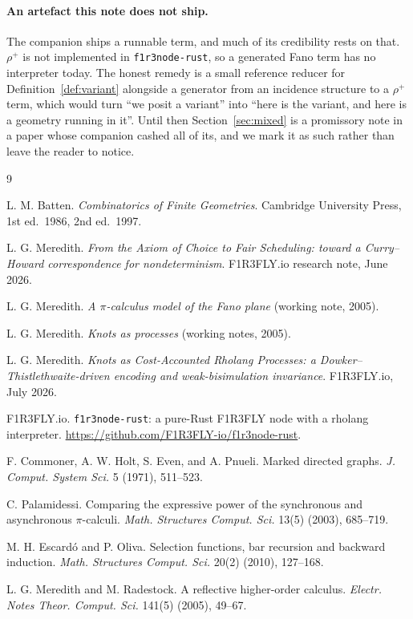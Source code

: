 \documentclass[11pt]{article}
\theoremstyle{plain}
\theoremstyle{definition}
\theoremstyle{remark}
\begin{document}
\paragraph{An artefact this note does not ship.} The companion \cite{KnotsNote} ships a
runnable term, and much of its credibility rests on that. $\rho^{+}$ is not implemented in
\texttt{f1r3node-rust}, so a generated Fano term has no interpreter today. The honest
remedy is a small reference reducer for Definition~\ref{def:variant} alongside a generator
from an incidence structure to a $\rho^{+}$ term, which would turn ``we posit a variant''
into ``here is the variant, and here is a geometry running in it''. Until then
Section~\ref{sec:mixed} is a promissory note in a paper whose companion cashed all of its,
and we mark it as such rather than leave the reader to notice.

\begin{thebibliography}{9}

 L. M. Batten. \emph{Combinatorics of Finite Geometries}. Cambridge
University Press, 1st ed.\ 1986, 2nd ed.\ 1997.

 L. G. Meredith. \emph{From the Axiom of Choice to Fair Scheduling: toward
a Curry--Howard correspondence for nondeterminism}. F1R3FLY.io research note, June 2026.

 L. G. Meredith. \emph{A $\pi$-calculus model of the Fano plane} (working
note, 2005).

 L. G. Meredith. \emph{Knots as processes} (working notes, 2005).

 L. G. Meredith. \emph{Knots as Cost-Accounted Rholang Processes: a
Dowker--Thistlethwaite-driven encoding and weak-bisimulation invariance}. F1R3FLY.io,
July 2026.

 F1R3FLY.io. \texttt{f1r3node-rust}: a pure-Rust F1R3FLY node with a rholang
interpreter. \url{https://github.com/F1R3FLY-io/f1r3node-rust}.

 F. Commoner, A. W. Holt, S. Even, and A. Pnueli. Marked directed graphs.
\emph{J. Comput. System Sci.} 5 (1971), 511--523.

 C. Palamidessi. Comparing the expressive power of the synchronous and
asynchronous $\pi$-calculi. \emph{Math. Structures Comput. Sci.} 13(5) (2003), 685--719.

 M. H. Escard\'o and P. Oliva. Selection functions, bar recursion and backward
induction. \emph{Math. Structures Comput. Sci.} 20(2) (2010), 127--168.

 L. G. Meredith and M. Radestock. A reflective higher-order calculus.
\emph{Electr. Notes Theor. Comput. Sci.} 141(5) (2005), 49--67.

\end{thebibliography}
\end{document}
